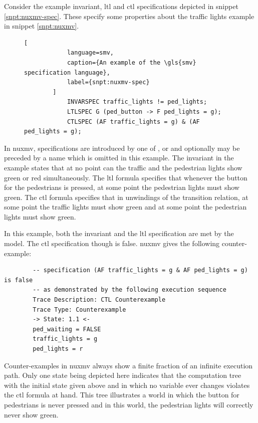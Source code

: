 \begin{example}
    Consider the example invariant, \gls{ltl} and \gls{ctl} specifications depicted in snippet \ref{snpt:nuxmv-spec}.
    These specify some properties about the traffic lights example in snippet \ref{snpt:nuxmv}.

    \begin{figure}
        \begin{lstlisting}[
            language=smv,
            caption={An example of the \gls{smv} specification language},
            label={snpt:nuxmv-spec}
        ]
            INVARSPEC traffic_lights != ped_lights;
            LTLSPEC G (ped_button -> F ped_lights = g);
            CTLSPEC (AF traffic_lights = g) & (AF ped_lights = g);
        \end{lstlisting}
    \end{figure}


    In \gls{nuxmv}, specifications are introduced by one of ,  or  and optionally may be preceded by a name which is omitted in this example.
    The invariant in the example states that at no point can the traffic and the pedestrian lights show green or red simultaneously.
    The \gls{ltl} formula specifies that whenever the button for the pedestrians is pressed, at some point the pedestrian lights must show green.
    The \gls{ctl} formula specifies that in unwindings of the transition relation, at some point the traffic lights must show green and at some point the pedestrian lights must show green.

    In this example, both the invariant and the \gls{ltl} specification are met by the model.
    The \gls{ctl} specification though is false.
    \gls{nuxmv} gives the following counter-example:

    \begin{lstlisting}
        -- specification (AF traffic_lights = g & AF ped_lights = g)  is false
        -- as demonstrated by the following execution sequence
        Trace Description: CTL Counterexample
        Trace Type: Counterexample
        -> State: 1.1 <-
        ped_waiting = FALSE
        traffic_lights = g
        ped_lights = r
    \end{lstlisting}

    Counter-examples in \gls{nuxmv} always show a finite fraction of an infinite execution path.
    Only one state being depicted here indicates that the computation tree with the initial state given above and in which no variable ever changes violates the \gls{ctl} formula at hand.
    This tree illustrates a world in which the button for pedestrians is never pressed and in this world, the pedestrian lights will correctly never show green.


\end{example}
